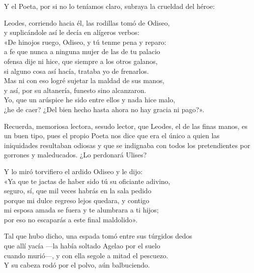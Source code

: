 Y el Poeta, por si no lo teníamos claro, subraya la crueldad del héroe:

\begin{versocita}
Leodes, corriendo hacia él, las rodillas tomó de Odiseo,\\
y suplicándole así le decía en alígeros verbos:\\
«De hinojos ruego, Odiseo, y tú tenme pena y reparo:\\
a fe que nunca a ninguna mujer de las de tu palacio\\
ofensa dije ni hice, que siempre a los otros galanos,\\
si alguno cosa así hacía, trataba yo de frenarlos.\\
Mas ni con eso logré sujetar la maldad de sus manos,\\
y así, por su altanería, funesto sino alcanzaron.\\
Yo, que un arúspice he sido entre ellos y nada hice malo,\\
¿he de caer? ¿Del bien hecho hasta ahora no hay gracia ni pago?».
\end{versocita}

Recuerda, memoriosa lectora, sesudo lector, que Leodes, el de las finas manos, es un buen tipo, pues el propio Poeta nos dice que era el único a quien las iniquidades resultaban odiosas y que se indignaba con todos los pretendientes por gorrones y maleducados. ¿Lo perdonará Ulises?

\begin{versocita}
Y lo miró torvifiero el ardido Odiseo y le dijo:\\
«Ya que te jactas de haber sido tú su oficiante adivino,\\
seguro, sí, que mil veces habrás en la sala pedido\\
porque mi dulce regreso lejos quedara, y contigo\\
mi esposa amada se fuera y te alumbrara a ti hijos;\\
por eso no escaparás a este final maldolido».
\end{versocita}

\begin{versocita}
Tal que hubo dicho, una espada tomó entre sus túrgidos dedos\\
que allí yacía ---la había soltado Agelao por el suelo\\
cuando murió---, y con ella segole a mitad el pescuezo.\\
Y su cabeza rodó por el polvo, aún balbuciendo.
\end{versocita}

